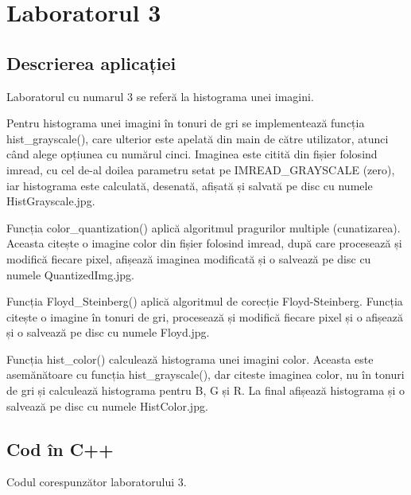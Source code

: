 \documentclass{amsart}
\begin{document}
\newpage

\section{Laboratorul 3}

\subsection{Descrierea aplicației}
\par
Laboratorul cu numarul 3 se referă la histograma unei imagini.
\\ \par
Pentru histograma unei imagini în tonuri de gri se implementează funcția \\hist\_grayscale(), care ulterior este apelată din main de către utilizator, atunci când alege opțiunea cu numărul cinci. Imaginea este citită din fișier folosind imread, cu cel de-al doilea parametru setat pe IMREAD\_GRAYSCALE (zero), iar histograma este calculată, desenată, afișată și salvată pe disc cu numele HistGrayscale.jpg.
\\ \par
Funcția color\_quantization() aplică algoritmul pragurilor multiple (cunatizarea). Aceasta citește o imagine color din fișier folosind imread, după care procesează și modifică fiecare pixel, afișează imaginea modificată și o salvează pe disc cu numele QuantizedImg.jpg.
\\ \par
Funcția Floyd\_Steinberg() aplică algoritmul de corecție Floyd-Steinberg. Funcția citește o imagine în tonuri de gri, procesează și modifică fiecare pixel și o afișează și o salvează pe disc cu numele Floyd.jpg.
\\ \par
Funcția hist\_color() calculează histograma unei imagini color. Aceasta este asemănătoare cu funcția hist\_grayscale(), dar citeste imaginea color, nu în tonuri de gri și calculează histograma pentru B, G și R. La final afișează histograma și o salvează pe disc cu numele HistColor.jpg.

\subsection{Cod \^{i}n C++}

Codul corespunzător laboratorului 3.
\end{document}
